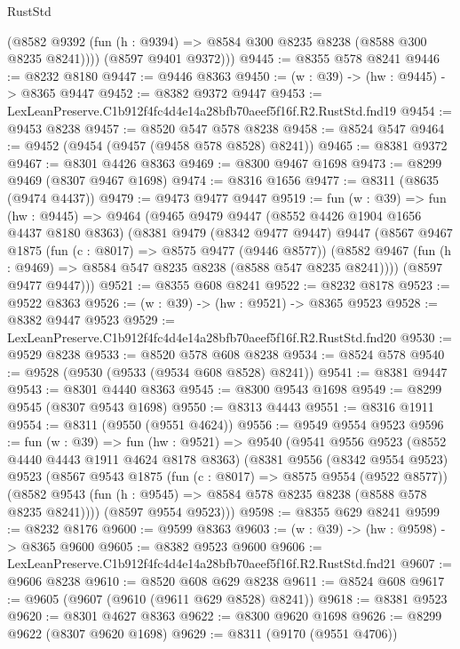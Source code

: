 \begin{lexlean}{RustStd}
\begin{coremodule}
          (@8582 @9392 (fun (h : @9394) => @8584 @300 @8235 @8238 (@8588 @300 @8235 @8241))))
        (@8597 @9401 @9372)))
@9445 := @8355 @578 @8241
@9446 := @8232 @8180
@9447 := @9446 @8363
@9450 := (w : @39) -> (hw : @9445) -> @8365 @9447
@9452 := @8382 @9372 @9447
@9453 := LexLeanPreserve.C1b912f4fc4d4e14a28bfb70aeef5f16f.R2.RustStd.fnd19
@9454 := @9453 @8238
@9457 := @8520 @547 @578 @8238
@9458 := @8524 @547
@9464 := @9452 (@9454 (@9457 (@9458 @578 @8528) @8241))
@9465 := @8381 @9372
@9467 := @8301 @4426 @8363
@9469 := @8300 @9467 @1698
@9473 := @8299 @9469 (@8307 @9467 @1698)
@9474 := @8316 @1656
@9477 := @8311 (@8635 (@9474 @4437))
@9479 := @9473 @9477 @9447
@9519 := fun (w : @39) =>
  fun (hw : @9445) =>
  @9464
    (@9465
      @9479
      @9447
      (@8552 @4426 @1904 @1656 @4437 @8180 @8363)
      (@8381
        @9479
        (@8342 @9477 @9447)
        @9447
        (@8567
          @9467
          @1875
          (fun (c : @8017) => @8575 @9477 (@9446 @8577))
          (@8582 @9467 (fun (h : @9469) => @8584 @547 @8235 @8238 (@8588 @547 @8235 @8241))))
        (@8597 @9477 @9447)))
@9521 := @8355 @608 @8241
@9522 := @8232 @8178
@9523 := @9522 @8363
@9526 := (w : @39) -> (hw : @9521) -> @8365 @9523
@9528 := @8382 @9447 @9523
@9529 := LexLeanPreserve.C1b912f4fc4d4e14a28bfb70aeef5f16f.R2.RustStd.fnd20
@9530 := @9529 @8238
@9533 := @8520 @578 @608 @8238
@9534 := @8524 @578
@9540 := @9528 (@9530 (@9533 (@9534 @608 @8528) @8241))
@9541 := @8381 @9447
@9543 := @8301 @4440 @8363
@9545 := @8300 @9543 @1698
@9549 := @8299 @9545 (@8307 @9543 @1698)
@9550 := @8313 @4443
@9551 := @8316 @1911
@9554 := @8311 (@9550 (@9551 @4624))
@9556 := @9549 @9554 @9523
@9596 := fun (w : @39) =>
  fun (hw : @9521) =>
  @9540
    (@9541
      @9556
      @9523
      (@8552 @4440 @4443 @1911 @4624 @8178 @8363)
      (@8381
        @9556
        (@8342 @9554 @9523)
        @9523
        (@8567
          @9543
          @1875
          (fun (c : @8017) => @8575 @9554 (@9522 @8577))
          (@8582 @9543 (fun (h : @9545) => @8584 @578 @8235 @8238 (@8588 @578 @8235 @8241))))
        (@8597 @9554 @9523)))
@9598 := @8355 @629 @8241
@9599 := @8232 @8176
@9600 := @9599 @8363
@9603 := (w : @39) -> (hw : @9598) -> @8365 @9600
@9605 := @8382 @9523 @9600
@9606 := LexLeanPreserve.C1b912f4fc4d4e14a28bfb70aeef5f16f.R2.RustStd.fnd21
@9607 := @9606 @8238
@9610 := @8520 @608 @629 @8238
@9611 := @8524 @608
@9617 := @9605 (@9607 (@9610 (@9611 @629 @8528) @8241))
@9618 := @8381 @9523
@9620 := @8301 @4627 @8363
@9622 := @8300 @9620 @1698
@9626 := @8299 @9622 (@8307 @9620 @1698)
@9629 := @8311 (@9170 (@9551 @4706))

\end{coremodule}
\end{lexlean}
